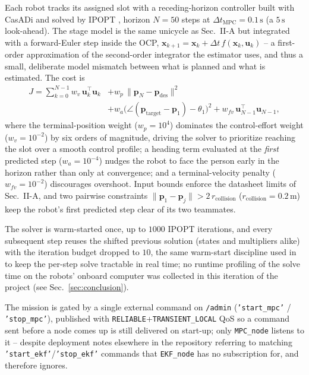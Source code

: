 \documentclass[10pt,conference]{IEEEtran}
\begin{document}
Each robot tracks its assigned slot with a receding-horizon controller built with CasADi and
solved by IPOPT \cite{casadi2019,wachter2006}, horizon $N=50$ steps at $\Delta t_{\text{MPC}}=0.1\,\mathrm{s}$
(a $5\,\mathrm{s}$ look-ahead). The stage model is the same unicycle as Sec.~II-A but
integrated with a forward-Euler step inside the OCP,
$\mathbf{x}_{k+1}=\mathbf{x}_k+\Delta t\, f(\mathbf{x}_k,\mathbf{u}_k)$ -- a first-order
approximation of the second-order integrator the estimator uses, and thus a small, deliberate
model mismatch between what is planned and what is estimated. The cost is
\begin{align}
J = \sum_{k=0}^{N-1} w_v\,\mathbf{u}_k^\top\mathbf{u}_k
&+ w_p\,\lVert \mathbf{p}_N - \mathbf{p}_{\text{des}}\rVert^2 \nonumber\\
&+ w_a\bigl(\angle(\mathbf{p}_{\text{target}}-\mathbf{p}_1) - \theta_1\bigr)^2
+ w_{fv}\,\mathbf{u}_{N-1}^\top\mathbf{u}_{N-1},
\end{align}
where the terminal-position weight ($w_p=10^4$) dominates the control-effort weight
($w_v=10^{-2}$) by six orders of magnitude, driving the solver to prioritize reaching the slot
over a smooth control profile; a heading term evaluated at the \emph{first} predicted step
($w_a=10^{-4}$) nudges the robot to face the person early in the horizon rather than only at
convergence; and a terminal-velocity penalty ($w_{fv}=10^{-2}$) discourages overshoot. Input
bounds enforce the datasheet limits of Sec.~II-A, and two pairwise constraints
$\lVert \mathbf{p}_1-\mathbf{p}_j\rVert > 2\,r_{\text{collision}}$ ($r_{\text{collision}}=0.2\,\mathrm{m}$)
keep the robot's first predicted step clear of its two teammates.

The solver is warm-started once, up to $1000$ IPOPT iterations, and every subsequent step reuses
the shifted previous solution (states and multipliers alike) with the iteration budget dropped to
$10$, the same warm-start discipline used in \cite{renelli-zanolini-artva} to keep the per-step
solve tractable in real time; no runtime profiling of the solve time on the robots' onboard
computer was collected in this iteration of the project (see Sec.~\ref{sec:conclusion}).

The mission is gated by a single external command on \texttt{/admin} (\texttt{'start\_mpc'} /
\texttt{'stop\_mpc'}), published with \texttt{RELIABLE}+\texttt{TRANSIENT\_LOCAL} QoS so a command
sent before a node comes up is still delivered on start-up; only \texttt{MPC\_node} listens to it
-- despite deployment notes elsewhere in the repository referring to matching
\texttt{'start\_ekf'}/\texttt{'stop\_ekf'} commands that \texttt{EKF\_node} has no subscription
for, and therefore ignores.
\end{document}
